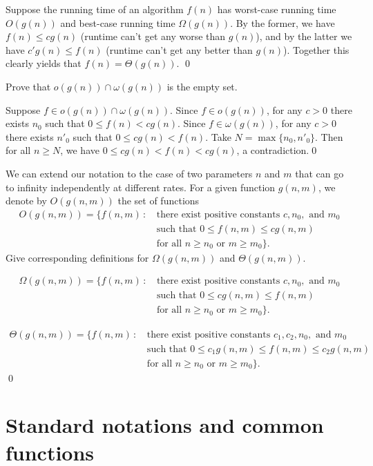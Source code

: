 Suppose the running time of an algorithm $f(n)$ has worst-case running time $O(g(n))$ and best-case running time $\Omega(g(n))$. By the former, we have $f(n) \leq cg(n)$ (runtime can't get any worse than $g(n)$), and by the latter we have $c'g(n) \leq f(n)$ (runtime can't get any better than $g(n)$). Together this clearly yields that $f(n) = \Theta(g(n))$. \qed

 Prove that $o(g(n)) \cap \omega(g(n))$ is the empty set.

\pf Suppose $f \in o(g(n)) \cap \omega(g(n))$. Since $f \in o(g(n))$, for any $c > 0$ there exists $n_0$ such that $0 \leq f(n) < cg(n)$. Since $f \in \omega(g(n))$, for any $c > 0$ there exists $n'_0$ such that $0 \leq cg(n) < f(n)$. Take $N = \max\{n_0, n'_0\}$. Then for all $n \geq N$, we have $0 \leq cg(n) < f(n) < cg(n)$, a contradiction.\qed

 We can extend our notation to the case of two parameters $n$ and $m$ that can go to infinity independently at different rates. For a given function $g(n,m)$, we denote by $O(g(n,m))$ the set of functions
\begin{align*}
    O(g(n,m)) = \{f(n,m) \,  : \, & \text{there exist positive constants } c, n_0, \text{ and } m_0 \\
    & \text{such that } 0 \leq f(n,m) \leq cg(n,m) \\
    & \text{for all }n \geq n_0 \text{ or } m \geq m_0\}.
\end{align*}
Give corresponding definitions for $\Omega(g(n,m))$ and $\Theta(g(n,m))$.

\sol 
\begin{align*}
    \Omega(g(n,m)) = \{f(n,m) \, : \, & \text{there exist positive constants } c, n_0, \text{ and } m_0 \\
    & \text{such that } 0 \leq cg(n,m) \leq f(n,m) \\
    & \text{for all } n \geq n_0 \text{ or } m \geq m_0\}.
\end{align*}

\begin{align*}
    \Theta(g(n,m)) = \{f(n,m) \, : \, & \text{there exist positive constants } c_1, c_2, n_0, \text{ and } m_0 \\
    & \text{such that } 0 \leq c_1 g(n,m) \leq f(n,m) \leq c_2 g(n,m) \\
    & \text{for all } n \geq n_0 \text{ or } m \geq m_0\}.
\end{align*}\qed

\section{Standard notations and common functions}

